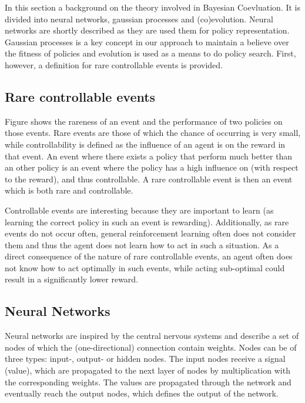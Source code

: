 In this section a background on the theory involved in Bayesian Coevluation. It is divided into neural networks, gaussian processes and (co)evolution. Neural networks are shortly described as they are used them for policy representation. Gaussian processes is a key concept in our approach to maintain a believe over the fitness of policies and evolution is used as a means to do policy search. First, however, a definition for rare controllable events is provided.

\subsection{Rare controllable events}
Figure %
shows the rareness of an event and the performance of two policies on those events. Rare events are those of which the chance of occurring is very small, while controllability is defined as the influence of an agent is on the reward in that event. An event where there exists a policy that perform much better than an other policy is an event where the policy has a high influence on (with respect to the reward), and thus controllable. A rare controllable event is then an event which is both rare and controllable.


Controllable events are interesting because they are important to learn (as learning the correct policy in such an event is rewarding). Additionally, as rare events do not occur often, general reinforcement learning often does not consider them and thus the agent does not learn how to act in such a situation. As a direct consequence of the nature of rare controllable events, an agent often does not know how to act optimally in such events, while acting sub-optimal could result in a significantly lower reward.

\subsection{Neural Networks}
Neural networks are inspired by the central nervous systems and describe a set of nodes of which the (one-directional) connection contain weights. Nodes can be of three types: input-, output- or hidden nodes. The input nodes receive a signal (value), which are propagated to the next layer of nodes by multiplication with the corresponding weights. The values are propagated through the network and eventually reach the output nodes, which defines the output of the network. 

